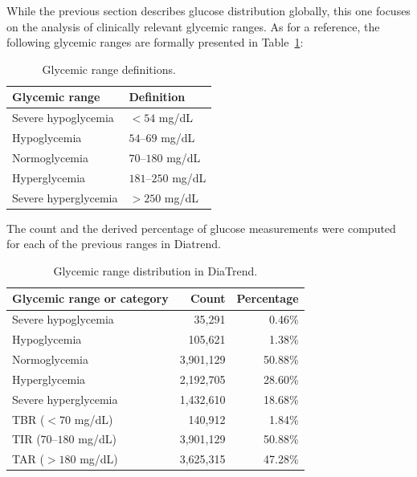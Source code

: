 While the previous section describes glucose distribution globally, this one focuses on the analysis of clinically relevant glycemic ranges. As for a reference, the following glycemic ranges are formally presented in Table~\ref{tab:glycemic_range_definitions}:

\begin{table}[htbp]
    \centering
    \caption{Glycemic range definitions.}
    \label{tab:glycemic_range_definitions}
    \begin{tabular}{ll}
        \hline
        \textbf{Glycemic range} & \textbf{Definition} \\
        \hline
        Severe hypoglycemia & $<54$ mg/dL \\
        Hypoglycemia & $54$--$69$ mg/dL \\
        Normoglycemia & $70$--$180$ mg/dL \\
        Hyperglycemia & $181$--$250$ mg/dL \\
        Severe hyperglycemia & $>250$ mg/dL \\
        \hline
    \end{tabular}
\end{table}

The count and the derived percentage of glucose measurements were computed for each of the previous ranges in Diatrend.

\begin{table}[htbp]
    \centering
    \caption{Glycemic range distribution in DiaTrend.}
    \label{tab:diatrend_glycemic_distribution}
    \begin{tabular}{lrr}
        \hline
        \textbf{Glycemic range or category} & \textbf{Count} & \textbf{Percentage} \\
        \hline
        Severe hypoglycemia & 35,291 & 0.46\% \\
        Hypoglycemia & 105,621 & 1.38\% \\
        Normoglycemia & 3,901,129 & 50.88\% \\
        Hyperglycemia & 2,192,705 & 28.60\% \\
        Severe hyperglycemia & 1,432,610 & 18.68\% \\
        \hline
        TBR ($<70$ mg/dL) & 140,912 & 1.84\% \\
        TIR ($70$--$180$ mg/dL) & 3,901,129 & 50.88\% \\
        TAR ($>180$ mg/dL) & 3,625,315 & 47.28\% \\
        \hline
    \end{tabular}
\end{table}

